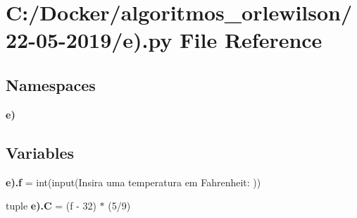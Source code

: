 \section{C\+:/\+Docker/algoritmos\+\_\+orlewilson/22-\/05-\/2019/e).py File Reference}
\label{e_08_8py}
\subsection*{Namespaces}
\begin{DoxyCompactItemize}
\item 
 \textbf{ e)}
\end{DoxyCompactItemize}
\subsection*{Variables}
\begin{DoxyCompactItemize}
\item 
\textbf{ e).\+f} = int(input(\textquotesingle{}Insira uma temperatura em Fahrenheit\+: \textquotesingle{}))
\item 
tuple \textbf{ e).\+C} = (f -\/ 32) $\ast$ (5/9)
\end{DoxyCompactItemize}
